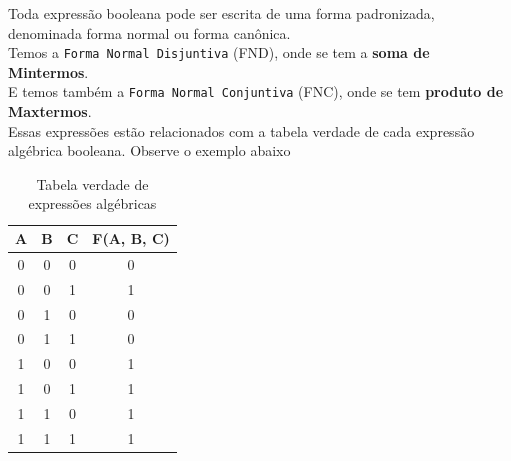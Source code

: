 \documentclass[12pt, onecolumn]{article}
\begin{document}
	Toda expressão booleana pode ser escrita de uma forma padronizada, 
	denominada forma normal ou forma canônica. \\
	\newline
	Temos a \texttt{Forma Normal Disjuntiva} (FND), onde se tem a 
	\textbf{soma de Mintermos}. \\
	\newline
	E temos também a \texttt{Forma Normal Conjuntiva} (FNC), onde se tem
	\textbf{produto de Maxtermos}. \\
	\newline
	Essas expressões estão relacionados com a tabela verdade de cada expressão
	algébrica booleana. Observe o exemplo abaixo\\
	\begin{table}[h]
                \centering
                \begin{tabular}{|c|c|c|c|}
                        \hline
			A & B & C & F(A, B, C)\\ \hline
			0 & 0 & 0 & 0 \\ \hline
			0 & 0 & 1 & 1 \\ \hline
			0 & 1 & 0 & 0 \\ \hline
			0 & 1 & 1 & 0 \\ \hline
			1 & 0 & 0 & 1 \\ \hline
			1 & 0 & 1 & 1 \\ \hline
			1 & 1 & 0 & 1 \\ \hline
			1 & 1 & 1 & 1 \\ \hline
                \end{tabular}
		\caption{Tabela verdade de expressões algébricas}
        \end{table}
\end{document}
